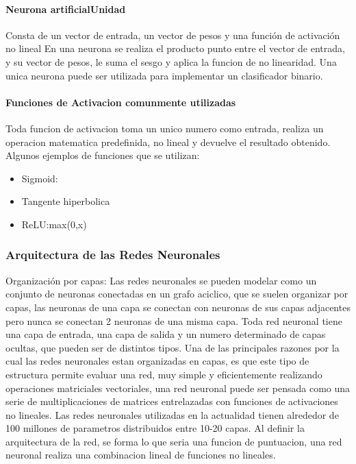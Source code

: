 \documentclass[a4paper,10pt]{article}
\begin{document}
\paragraph {Neurona artificialUnidad}
Consta de un vector de entrada, un vector de pesos y una función de activación no lineal
En una neurona se realiza el producto punto entre el vector de entrada, y su vector de pesos, le suma el sesgo y aplica la funcion de no linearidad.
Una unica neurona puede ser utilizada para implementar un clasificador binario.

\paragraph {Funciones de Activacion comunmente utilizadas}
Toda funcion de activacion toma un unico numero como entrada, realiza un operacion matematica predefinida, no lineal y devuelve el resultado obtenido.
Algunos ejemplos de funciones que se utilizan:
  \begin{itemize}
  \item Sigmoid:
  \item Tangente hiperbolica
  \item ReLU:max(0,x)
  \end{itemize}

\subsubsection {Arquitectura de las Redes Neuronales}
Organización por capas: Las redes neuronales se pueden modelar como un conjunto de neuronas conectadas en un grafo aciclico, que se suelen organizar por capas, las neuronas de una capa
se conectan con neuronas de sus capas adjacentes pero nunca se conectan 2 neuronas de una misma capa.
Toda red neuronal tiene una capa de entrada, una capa de salida y un numero determinado de capas ocultas, que pueden ser de distintos tipos.
Una de las principales razones por la cual las redes neuronales estan organizadas en capas, es que este tipo de estructura permite evaluar una red, muy simple y eficientemente realizando
operaciones matriciales vectoriales, una red neuronal puede ser pensada como una serie de multiplicaciones de matrices entrelazadas con funciones de activaciones no lineales.
Las redes neuronales utilizadas en la actualidad tienen alrededor de 100 millones de parametros distribuidos entre 10-20 capas.
Al definir la arquitectura de la red, se forma lo que seria una funcion de puntuacion, una red neuronal realiza una combinacion lineal de funciones no lineales. 
\end{document}
